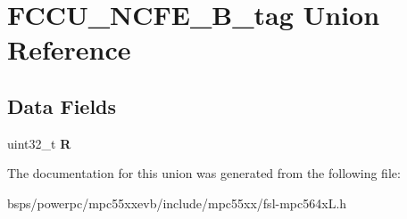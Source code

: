 \hypertarget{unionFCCU__NCFE__32B__tag}{}\section{F\+C\+C\+U\+\_\+\+N\+C\+F\+E\+\_\+B\+\_\+tag Union Reference}
\label{unionFCCU__NCFE__32B__tag}
\subsection*{Data Fields}
\begin{DoxyCompactItemize}
\item 
\mbox{\label{unionFCCU__NCFE__32B__tag_a1e0265bf61e84eab44d66fb82e91e76f}} 
uint32\+\_\+t {\bfseries R}
\end{DoxyCompactItemize}


The documentation for this union was generated from the following file\+:\begin{DoxyCompactItemize}
\item 
bsps/powerpc/mpc55xxevb/include/mpc55xx/fsl-\/mpc564x\+L.\+h\end{DoxyCompactItemize}
